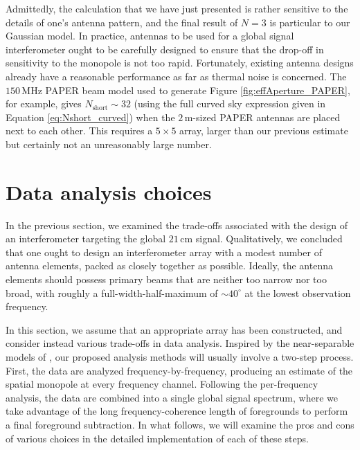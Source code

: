 \documentclass[twocolumn,apj,numberedappendix]{emulateapj}
\newcommand{\acl}[1]{}
\newcommand{\mep}[1]{}
\begin{document}
\acl{Added this paragraph} Admittedly, the calculation that we have just presented is rather sensitive to the details of one's antenna pattern, and the final result of $N=3$ is particular to our Gaussian model. In practice, antennas to be used for a global signal interferometer ought to be carefully designed to ensure that the drop-off in sensitivity to the monopole is not too rapid. Fortunately, existing antenna designs already have a reasonable performance as far as thermal noise is concerned. The $150\,\textrm{MHz}$ PAPER beam model used to generate Figure \ref{fig:effAperture_PAPER}, for example, gives $N_\textrm{short} \sim 32$ (using the full curved sky expression given in Equation \ref{eq:Nshort_curved}) when the $2\,\textrm{m}$-sized PAPER antennas are placed next to each other. This requires a $5 \times 5$ array, larger than our previous estimate but certainly not an unreasonably large number.
%


\section{Data analysis choices}
\label{sec:MathForm}

In the previous section, we examined the trade-offs associated with the design of an interferometer targeting the global $21\,\textrm{cm}$ signal. Qualitatively, we concluded that one ought to design an interferometer array with a modest number of antenna elements, packed as closely together as possible. Ideally, the antenna elements should possess primary beams that are neither too narrow nor too broad, with roughly a full-width-half-maximum of $\sim 40^\circ$ at the lowest observation frequency.

In this section, we assume that an appropriate array has been constructed, and consider instead various trade-offs in data analysis. Inspired by the near-separable models of \citet{Liu_Switzer_2014}, our proposed analysis methods will usually involve a two-step process. First, the data are analyzed frequency-by-frequency, producing an estimate of the spatial monopole at every frequency channel. Following the per-frequency analysis, the data are combined into a single global signal spectrum, where we take advantage of the long frequency-coherence length of foregrounds to perform a final foreground subtraction. In what follows, we will examine the pros and cons of various choices in the detailed implementation of each of these steps.
\end{document}

